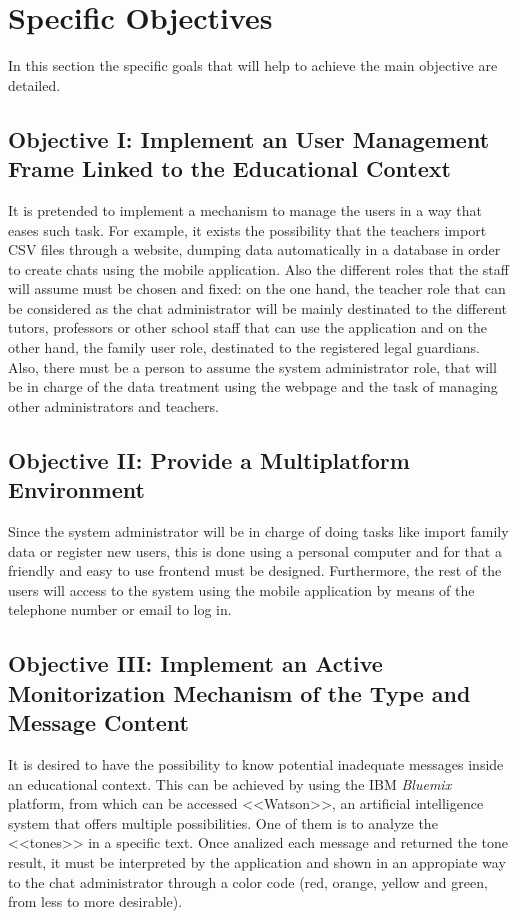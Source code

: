 \section{Specific Objectives}
In this section the specific goals that will help to achieve the main objective are \mbox{detailed}.

\clearpage

\subsection{Objective I: Implement an User Management Frame Linked to the Educational Context}
It is pretended to implement a mechanism to manage the users in a way that eases such task. For example, it exists the possibility that the teachers import CSV files through a \mbox{website}, dumping data automatically in a database in order to create chats using the mobile application. Also the different roles that the staff will assume must be chosen and fixed: on the one hand, the teacher role that can be considered as the chat administrator will be mainly destinated to the different tutors, professors or other school staff that can use the \mbox{application} and on the other hand, the family user role, destinated to the registered legal guardians. \mbox{Also}, there must be a person to assume the system administrator role, that will be in charge of the data treatment using the webpage and the task of managing other administrators and teachers.

\subsection{Objective II: Provide a Multiplatform Environment}
Since the system administrator will be in charge of doing tasks like import family data or register new users, this is done using a personal computer and for that a friendly and easy to use frontend must be designed. Furthermore, the rest of the users will access to the system using the mobile application by means of the telephone number or email to log in.

\subsection{Objective III: Implement an Active Monitorization Mechanism of the Type and Message Content}
It is desired to have the possibility to know potential inadequate messages inside an \mbox{educational} context. This can be achieved by using the IBM \textit{Bluemix} platform, from which can be accessed <<Watson>>, an artificial intelligence system that offers multiple possibilities. One of them is to analyze the <<tones>> in a specific text. Once analized each message and returned the tone result, it must be interpreted by the application and shown in an appropiate way to the chat administrator through a color code (red, orange, yellow and green, from less to more desirable).

